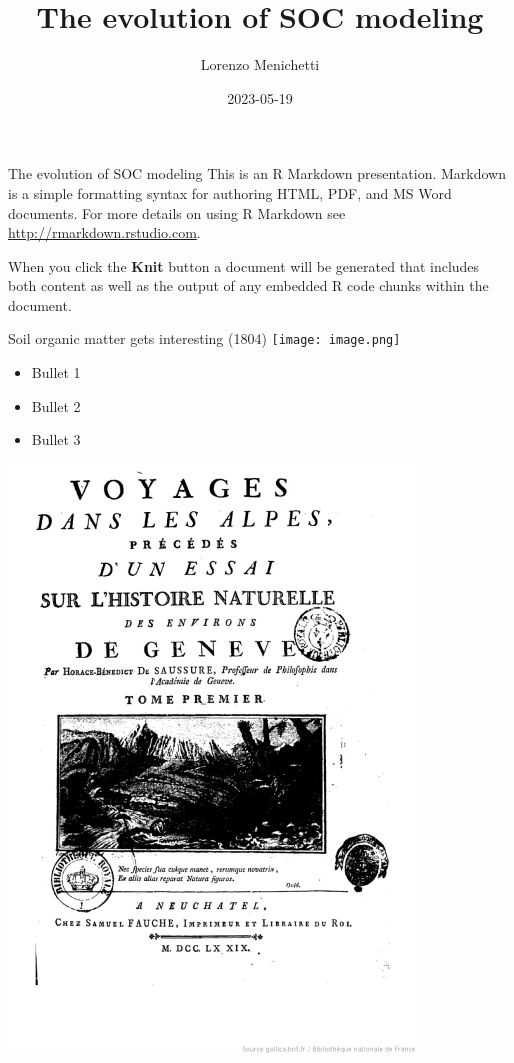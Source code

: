 \documentclass[
  ignorenonframetext,
]{beamer}
\title{The evolution of SOC modeling}
\author{Lorenzo Menichetti}
\date{2023-05-19}
\providecommand{\tightlist}{%
  \setlength{\itemsep}{0pt}\setlength{\parskip}{0pt}}
\begin{document}
\frame{\titlepage}

\begin{frame}{The evolution of SOC modeling}
\protect\hypertarget{the-evolution-of-soc-modeling}{}
This is an R Markdown presentation. Markdown is a simple formatting
syntax for authoring HTML, PDF, and MS Word documents. For more details
on using R Markdown see \url{http://rmarkdown.rstudio.com}.

When you click the \textbf{Knit} button a document will be generated
that includes both content as well as the output of any embedded R code
chunks within the document.
\end{frame}

\begin{frame}{Soil organic matter gets interesting (1804)}
\protect\hypertarget{soil-organic-matter-gets-interesting-1804}{}
\texttt{[image: image.png]}

\begin{itemize}
\tightlist
\item
  Bullet 1
\item
  Bullet 2
\item
  Bullet 3
\end{itemize}

\includegraphics[width=\textwidth,height=0.6\textheight]{Saussure.png}
\end{frame}
\end{document}
